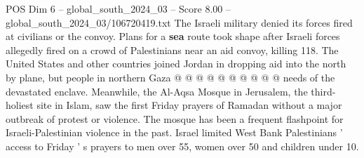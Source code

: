 \begin{textsample}{POS Dim 6 – global\_south\_2024\_03 – Score 8.00 – global\_south\_2024\_03/106720419.txt}
The Israeli military denied its forces fired at civilians or the convoy.
Plans for a \textbf{sea} route took shape after Israeli forces allegedly fired on a crowd of Palestinians near an aid convoy, killing 118.
The United States and other countries joined Jordan in dropping aid into the north by plane, but people in northern Gaza @ @ @ @ @ @ @ @ @ @ needs of the devastated enclave.
Meanwhile, the Al-Aqsa Mosque in Jerusalem, the third-holiest site in Islam, saw the first Friday prayers of Ramadan without a major outbreak of protest or violence.
The mosque has been a frequent flashpoint for Israeli-Palestinian violence in the past.
Israel limited West Bank Palestinians ' access to Friday ' s prayers to men over 55, women over 50 and children under 10.

\end{textsample}
